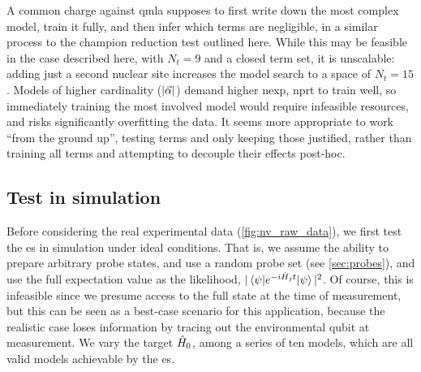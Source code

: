 A common charge against \gls{qmla} supposes to first write down the most complex model, 
    train it fully, and then infer which terms are negligible, in a similar process to the champion reduction test outlined here. 
While this may be feasible in the case described here, with $N_t=9$ and a closed term set, 
    it is unscalable: adding just a second nuclear site increases the \gls{model search} to a space of $N_t=15$.
Models of higher cardinality ($|\vec{\alpha}|$) demand higher \gls{nexp}, \gls{nprt} to train well, so immediately training the most involved model would 
    require infeasible resources\footnotemark, and risks significantly overfitting the data. 
It seems more appropriate to work ``from the ground up'', testing terms and only keeping those justified, 
    rather than training all terms and attempting to decouple their effects post-hoc. 

\par 
\subsection{Test in simulation}
Before considering the real experimental data (\cref{fig:nv_raw_data}), 
    we first test the \gls{es} in simulation under ideal conditions. 
That is, we assume the ability to prepare arbitrary \gls{probe} states, 
    and use a random \gls{probe} set (see \cref{sec:probes}),
    and use the full expectation value as the likelihood, $|\braket{\psi | e^{-i \hat{H}_j t} | \psi}|^2$.
Of course, this is infeasible since we presume access to the full state at the time of measurement, 
    but this can be seen as a best-case scenario for this application, 
    because the realistic case loses information by tracing out the environmental qubit at measurement.
We vary the target $\hat{H}_0$, among a series of ten models,
    which are all valid models achievable by the \gls{es}. 


